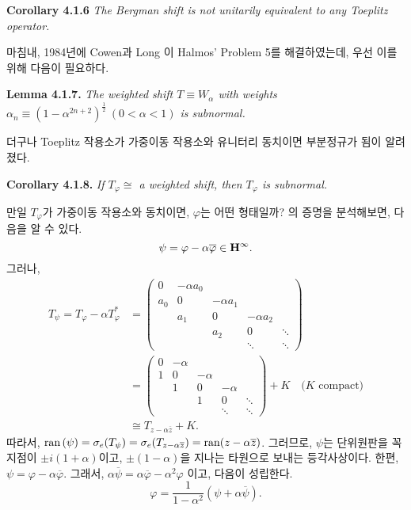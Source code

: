 \documentclass[12pt,a4paper,2sided]{article}
\begin{document}
{\bf Corollary 4.1.6} {\sl The Bergman shift is not unitarily
equivalent to any Toeplitz operator.} \vspace{.2 cm}

\vspace{.2 cm}

마침내, 1984년에 Cowen과 Long \cite{CoL}이 Halmos' Problem 5를
해결하였는데, 우선 이를 위해 다음이 필요하다.

\vspace{.2 cm} {\bf Lemma 4.1.7.} {\sl The weighted shift $T\equiv
W_{\alpha}$ with weights $\alpha_n\equiv
(1-\alpha^{2n+2})^{\frac{1}{2}}\ (0<\alpha <1)$ is subnormal.}

\vspace{.2 cm} 더구나 Toeplitz 작용소가 가중이동 작용소와 유니터리
동치이면 부분정규가 됨이 알려졌다.



\newpage{}

\vspace{.8 cm}

{\bf Corollary 4.1.8.} {\sl If $T_{\varphi} \cong$ a weighted shift,
then $T_\varphi$ is subnormal.} \vspace{.2 cm}

만일  $T_\varphi$가 가중이동 작용소와 동치이면,
$\varphi$는 어떤 형태일까?
\cite[Theorem 3.7]{Sun}의 증명을 분석해보면,
다음을 알 수 있다.
$$
\psi=\varphi -\alpha\overline{\varphi}\in {\bold H}^{\infty}.
$$
그러나,
\begin{align*}
T_\psi =T_\varphi -\alpha T_{\varphi}^* &=
{\begin{pmatrix}
0 &-\alpha a_0\\
a_0&0&-\alpha a_1\\
&a_1&0&-\alpha a_2\\
&&a_2&0&\ddots\\
&&&\ddots&\ddots
 \end{pmatrix}}\\
&=\begin{pmatrix}
0 &-\alpha\\
1&0&-\alpha\\
&1&0&-\alpha\\
&&1&0&\ddots\\
 &&&\ddots&\ddots
\end{pmatrix} + K\quad \mbox{($K$ compact)}\\
&\cong T_{z-\alpha\overline{z}}+K.
\end{align*}
따라서,
$\mbox{ran}\,(\psi)=\sigma_{e}(T_{\psi})
=\sigma_{e}(T_{z-\alpha\overline{z}})={\rm ran}(z-\alpha\overline{z})$.
그러므로, $\psi$는 단위원판을 꼭지점이  $\pm i(1+\alpha)$이고,  $\pm(1-\alpha)$을
지나는 타원으로 보내는 등각사상이다.
한편, $\psi=\varphi -\alpha\overline{\varphi}$.
그래서,
$\alpha\overline{\psi}=\alpha\overline{\varphi} -\alpha^2\varphi$
이고, 다음이 성립한다.
$$
\varphi=\frac{1}{1-\alpha^2}(\psi +\alpha\overline{\psi}).
$$
\end{document}
